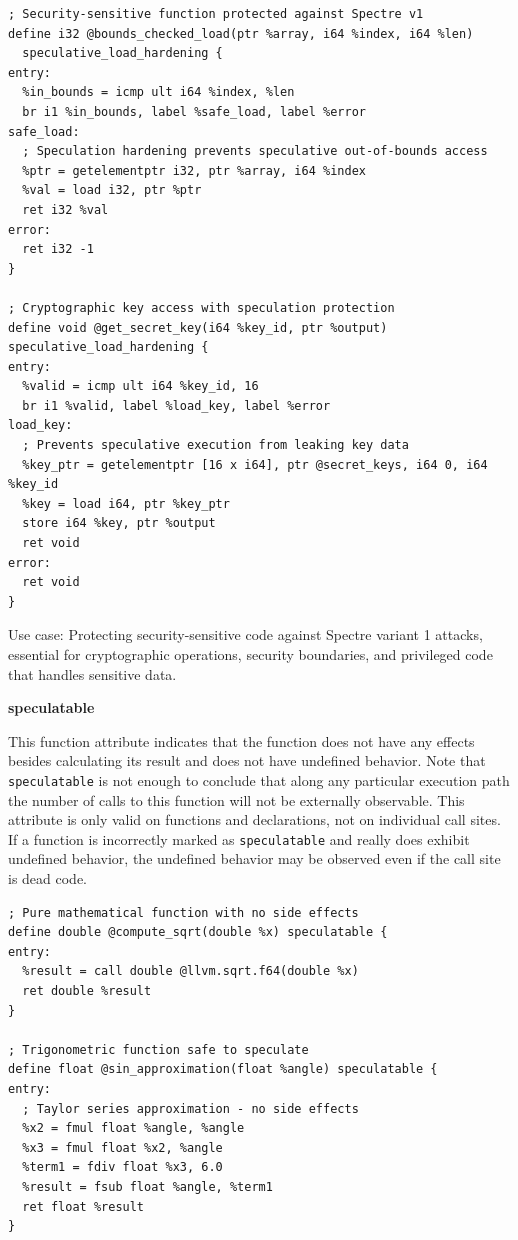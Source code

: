 \begin{lstlisting}[style=ir]
; Security-sensitive function protected against Spectre v1
define i32 @bounds_checked_load(ptr %array, i64 %index, i64 %len)
  speculative_load_hardening {
entry:
  %in_bounds = icmp ult i64 %index, %len
  br i1 %in_bounds, label %safe_load, label %error
safe_load:
  ; Speculation hardening prevents speculative out-of-bounds access
  %ptr = getelementptr i32, ptr %array, i64 %index
  %val = load i32, ptr %ptr
  ret i32 %val
error:
  ret i32 -1
}

; Cryptographic key access with speculation protection
define void @get_secret_key(i64 %key_id, ptr %output) speculative_load_hardening {
entry:
  %valid = icmp ult i64 %key_id, 16
  br i1 %valid, label %load_key, label %error
load_key:
  ; Prevents speculative execution from leaking key data
  %key_ptr = getelementptr [16 x i64], ptr @secret_keys, i64 0, i64 %key_id
  %key = load i64, ptr %key_ptr
  store i64 %key, ptr %output
  ret void
error:
  ret void
}
\end{lstlisting}

Use case: Protecting security-sensitive code against Spectre variant 1 attacks, essential for cryptographic operations, security boundaries, and privileged code that handles sensitive data.

\textbf{speculatable}

This function attribute indicates that the function does not have any effects besides calculating its result and does not have undefined behavior.
Note that \texttt{speculatable} is not enough to conclude that along any particular execution path the number of calls to this function will not be externally observable.
This attribute is only valid on functions and declarations, not on individual call sites.
If a function is incorrectly marked as \texttt{speculatable} and really does exhibit undefined behavior, the undefined behavior may be observed even if the call site is dead code.

\begin{lstlisting}[style=ir]
; Pure mathematical function with no side effects
define double @compute_sqrt(double %x) speculatable {
entry:
  %result = call double @llvm.sqrt.f64(double %x)
  ret double %result
}

; Trigonometric function safe to speculate
define float @sin_approximation(float %angle) speculatable {
entry:
  ; Taylor series approximation - no side effects
  %x2 = fmul float %angle, %angle
  %x3 = fmul float %x2, %angle
  %term1 = fdiv float %x3, 6.0
  %result = fsub float %angle, %term1
  ret float %result
}
\end{lstlisting}

